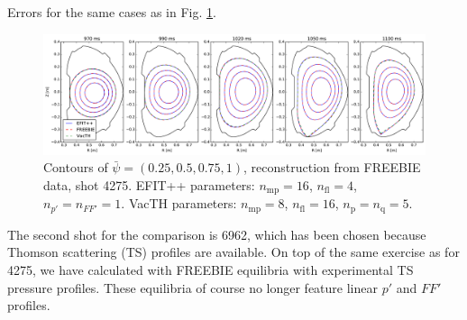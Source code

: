 \begin{table}
\caption{Errors for the same cases as in Fig. \ref{fig:ex4275}.}
\label{table:ex4275}
\end{table}

\begin{figure}
\centering   %
\hfill{}
\includegraphics[width=18cm]{figures/example_4275.pdf}
\hfill{}
\caption{Contours of $\bar\psi=\left(0.25,0.5,0.75,1\right)$, reconstruction from FREEBIE data, shot 4275. EFIT++ parameters: $n_\mathrm{mp} = 16$, $n_\mathrm{fl} = 4$, $n_{p'} = n_{FF'} = 1$. VacTH parameters: $n_\mathrm{mp} = 8$, $n_\mathrm{fl} = 16$, $n_{\mathrm p} = n_{\mathrm q} = 5$.}
\label{fig:ex4275}
\end{figure}


The second shot for the comparison is 6962, which has been chosen because Thomson scattering (TS) profiles are available. On top of the same exercise as for 4275, we have calculated with FREEBIE equilibria with experimental TS pressure profiles. These equilibria of course no longer feature linear $p'$ and $FF'$ profiles.



